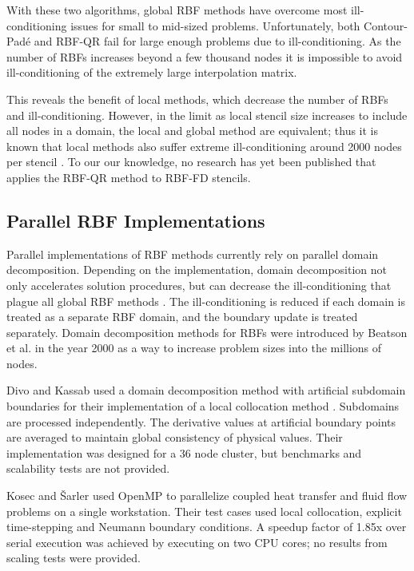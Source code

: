 \documentclass{report}
\begin{document}
{With these two algorithms, global RBF methods have overcome most ill-conditioning issues for small to mid-sized problems. Unfortunately, both Contour-Pad\'{e} and RBF-QR fail for large enough problems due to ill-conditioning. As the number of RBFs increases beyond a few thousand nodes it is impossible to avoid  ill-conditioning of the extremely large interpolation matrix.

This reveals the benefit of local methods, which decrease the number of RBFs and ill-conditioning. However, in the limit as local stencil size increases to include all nodes in a domain, the local and global method are equivalent; thus it is known that local methods also suffer extreme ill-conditioning around 2000 nodes per stencil \cite{Shu2006}. To our our knowledge, no research has yet been published that applies the RBF-QR method to RBF-FD stencils.


\subsection{Parallel RBF Implementations}

Parallel implementations of RBF methods currently rely on parallel domain decomposition. Depending on the implementation, domain decomposition not only accelerates solution procedures, but can decrease the ill-conditioning that plague all global RBF methods \cite{Divo2007}. The ill-conditioning is reduced if each domain is treated as a separate RBF domain, and the boundary update is treated separately. Domain decomposition methods for RBFs were introduced by Beatson et al. \cite{Beatson2000} in the year 2000 as a way to increase problem sizes into the millions of nodes.

Divo and Kassab \cite{Divo2007} used a domain decomposition method with artificial 
subdomain boundaries for their implementation of a local collocation method \cite{Divo2007}. 
Subdomains are processed independently. The derivative values 
at artificial boundary points are averaged to maintain global consistency of physical values. Their implementation 
was designed for a 36 node cluster, but benchmarks and scalability tests are not provided.


Kosec and \v{S}arler \cite{Kosec2008} used OpenMP to parallelize coupled heat transfer 
and fluid flow problems on a single workstation. 
Their test cases used local collocation, explicit time-stepping and Neumann boundary conditions. A speedup 
factor of 1.85x over serial execution was achieved by executing on two CPU cores; no 
results from scaling tests were provided. 

}
\end{document}
